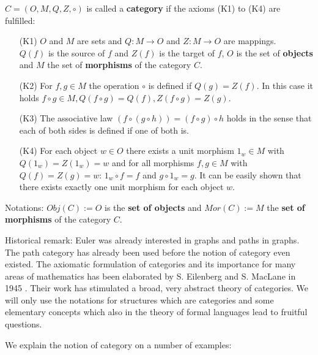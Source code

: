 \begin{definition}
$C = (O, M, Q, Z, \circ)$ is called a {\bf category} if the axioms (K1) to
(K4) are fulfilled:
\begin{enumerate}
  \item[(K1)] $O$ and $M$ are sets and $Q: M \to O$ and $Z: M \to O$ are
  mappings.\\
  $Q(f)$ is the source of $f$ and $Z(f)$ is the target of $f$, $O$ is the set of
  {\bf objects} and $M$ the set of {\bf morphisms} of the category $C$.
  \item[(K2)] For $f, g \in M$ the operation $\circ$ is defined if $Q(g) =
  Z(f)$. In this case it holds $f \circ g \in M, Q(f \circ g) = Q(f), Z(f
  \circ g) = Z(g)$.
  \item[(K3)] The associative law $(f \circ (g \circ h)) = (f \circ g) \circ h$
  holds in the sense that each of both sides is defined if one of both is.
  \item[(K4)] For each object $w \in O$ there exists a unit morphism $1_w \in M$
  with $Q(1_w) = Z(1_w) = w$ and for all morphisms $f, g \in M$ with $Q(f) =
  Z(g) = w$: $1_w \circ f = f$ and $g \circ 1_w = g$. It can be easily shown
  that there exists exactly one unit morphism for each object $w$.
\end{enumerate}
\end{definition}


Notations: $Obj(C) := O$ is the {\bf set of objects} and $Mor(C) := M$ the
{\bf set of morphisms} of the category $C$.

Historical remark: Euler was already interested in graphs and paths in graphs.
The path category has already been used before the notion of category even
existed. The axiomatic formulation of categories and its importance for many
areas of mathematics has been elaborated by S. Eilenberg and S. MacLane in 1945
\cite{Ei.Ma}. Their work has stimulated a broad, very abstract theory of
categories. We will only use the notations for structures which are categories
and some elementary concepts which also in the theory of formal languages lead
to fruitful questions.

We explain the notion of category on a number of examples:


